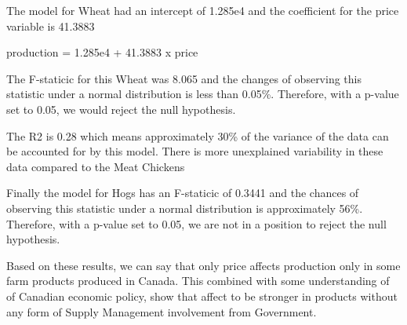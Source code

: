 The model for Wheat had an intercept of 1.285e4 and the coefficient for the price variable is 41.3883

production  =  1.285e4 + 41.3883 x price 

The F-staticic for this Wheat was 8.065 and the changes of observing this statistic under a normal distribution is less than 0.05\%. Therefore, with a p-value set to 0.05, we would reject the null hypothesis. 

The R2 is 0.28 which means approximately 30\% of the variance of the data can be accounted for by this model. There is more unexplained variability in these data compared to the Meat Chickens

Finally the model for Hogs has an F-staticic of 0.3441 and the chances of observing this statistic under a normal distribution is approximately 56\%. Therefore, with a p-value set to 0.05, we are not in a position to reject the null hypothesis. 

Based on these results, we can say that only price affects production only in some farm products produced in Canada. This combined with some understanding of of Canadian economic policy, show that affect to be stronger in products without any form of Supply Management involvement from Government. 
